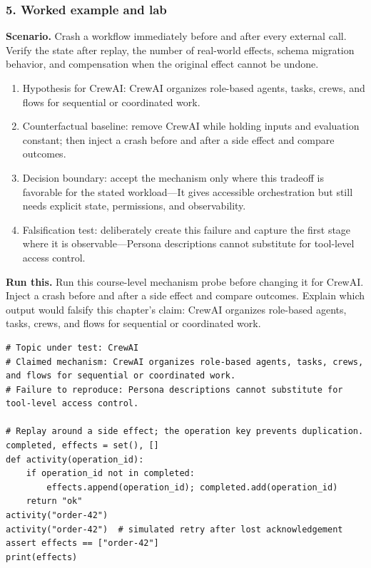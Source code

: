 \subsubsection*{5. Worked example and lab}
\textbf{Scenario.} Crash a workflow immediately before and after every external call. Verify the state after replay, the number of real-world effects, schema migration behavior, and compensation when the original effect cannot be undone.
\begin{enumerate}
\item Hypothesis for CrewAI: CrewAI organizes role-based agents, tasks, crews, and flows for sequential or coordinated work.
\item Counterfactual baseline: remove CrewAI while holding inputs and evaluation constant; then inject a crash before and after a side effect and compare outcomes.
\item Decision boundary: accept the mechanism only where this tradeoff is favorable for the stated workload—It gives accessible orchestration but still needs explicit state, permissions, and observability.
\item Falsification test: deliberately create this failure and capture the first stage where it is observable—Persona descriptions cannot substitute for tool-level access control.
\end{enumerate}
\textbf{Run this.} Run this course-level mechanism probe before changing it for CrewAI. Inject a crash before and after a side effect and compare outcomes. Explain which output would falsify this chapter's claim: CrewAI organizes role-based agents, tasks, crews, and flows for sequential or coordinated work.
\begin{Verbatim}[fontsize=\scriptsize]
# Topic under test: CrewAI
# Claimed mechanism: CrewAI organizes role-based agents, tasks, crews, and flows for sequential or coordinated work.
# Failure to reproduce: Persona descriptions cannot substitute for tool-level access control.

# Replay around a side effect; the operation key prevents duplication.
completed, effects = set(), []
def activity(operation_id):
    if operation_id not in completed:
        effects.append(operation_id); completed.add(operation_id)
    return "ok"
activity("order-42")
activity("order-42")  # simulated retry after lost acknowledgement
assert effects == ["order-42"]
print(effects)
\end{Verbatim}
